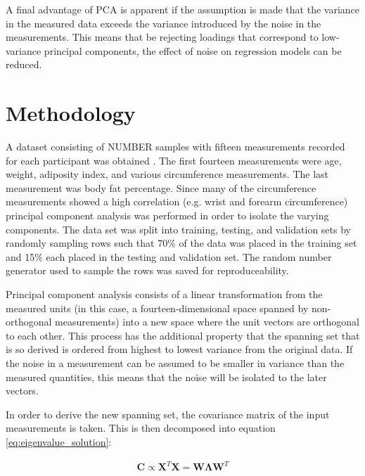 \documentclass{IEEEtran}
\begin{document}
A final advantage of PCA is apparent if the assumption is made that the variance in the measured data exceeds the variance introduced by the noise in the measurements. This means that be rejecting loadings that correspond to low-variance principal components, the effect of noise on regression models can be reduced.

\section{Methodology} 

A dataset consisting of NUMBER samples with fifteen measurements recorded for each participant was obtained \cite{Penrose1985}. The first fourteen measurements were age, weight, adiposity index, and various circumference measurements. The last measurement was body fat percentage. Since many of the circumference measurements showed a high correlation (e.g. wrist and forearm circumference) principal component analysis was performed in order to isolate the varying components. The data set was split into training, testing, and validation sets by randomly sampling rows such that 70\% of the data was placed in the training set and 15\% each placed in the testing and validation set. The random number generator used to sample the rows was saved for reproduceability. 

Principal component analysis consists of a linear transformation from the measured units (in this case, a fourteen-dimensional space spanned by non-orthogonal measurements) into a new space where the unit vectors are orthogonal to each other. This process has the additional property that the spanning set that is so derived is ordered from highest to lowest variance from the original data. If the noise in a measurement can be assumed to be smaller in variance than the measured quantities, this means that the noise will be isolated to the later vectors.

In order to derive the new spanning set, the covariance matrix of the input measurements is taken. This is then decomposed into equation \ref{eq:eigenvalue_solution}:

\begin{align}
	\mathbf{C} \propto \mathbf{X}^T \mathbf{X} = \mathbf{W} \mathbf{\Lambda} \mathbf{W}^T
	\label{eq:eigenvalue_solution}
\end{align}
\end{document}
